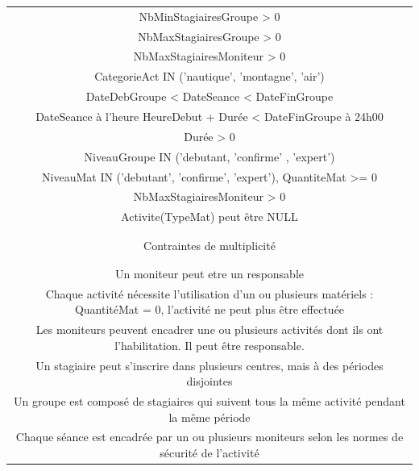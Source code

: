 \documentclass[10pt]{article}
\begin{document}
\begin{small}
\begin{tabular}{|c|}
\\NbMinStagiairesGroupe > 0 \\

NbMaxStagiairesGroupe > 0\\

NbMaxStagiairesMoniteur > 0\\

CategorieAct IN ('nautique', 'montagne', 'air')\\

DateDebGroupe < DateSeance < DateFinGroupe\\

DateSeance à l'heure HeureDebut + Durée < DateFinGroupe à 24h00\\

Durée > 0\\

NiveauGroupe IN ('debutant, 'confirme' , 'expert')\\

NiveauMat IN ('debutant', 'confirme', 'expert'), QuantiteMat >= 0\\

NbMaxStagiairesMoniteur > 0\\

Activite(TypeMat) peut être NULL\\ \\

\hline
\\Contraintes de multiplicité\\ \\
\hline

\\Un moniteur peut etre un responsable\\

Chaque activité nécessite l'utilisation d'un ou plusieurs matériels : QuantitéMat = 0, l'activité ne peut plus être 
effectuée\\

Les moniteurs peuvent encadrer une ou plusieurs activités dont ils ont l'habilitation. Il peut être responsable.\\

Un stagiaire peut s'inscrire dans plusieurs centres, mais à des périodes disjointes\\

Un groupe est composé de stagiaires qui suivent tous la même activité pendant la même période\\

Chaque séance est encadrée par un ou plusieurs moniteurs selon les normes de sécurité de l'activité\\


\end{tabular}
\end{small}
\end{document}
